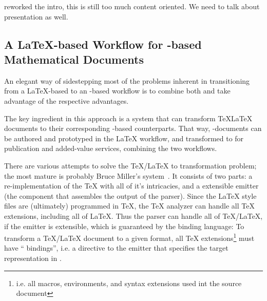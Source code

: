 \begin{newpart}{reworked the intro, this is still too much content oriented. We need to
    talk about presentation as well. }
\subsection{A {\LaTeX}-based Workflow for {\xml}-based Mathematical Documents}
 
An elegant way of sidestepping most of the problems inherent in transitioning from a
{\LaTeX}-based to an {\xml}-based workflow is to combine both and take advantage of the
respective advantages.
 
The key ingredient in this approach is a system that can transform {\TeX\LaTeX} documents
to their corresponding {\xml}-based counterparts. That way, {\xml}-documents can be
authored and prototyped in the {\LaTeX} workflow, and transformed to {\xml} for
publication and added-value services, combining the two workflows.
 
There are various attempts to solve the {\TeX/\LaTeX} to {\xml} transformation problem; the
most mature is probably Bruce Miller's {\latexml} system~\cite{Miller:latexml}. It
consists of two parts: a re-implementation of the {\TeX} {} with all of
it's intricacies, and a extensible {\xml} emitter (the component that assembles the output
of the parser). Since the {\LaTeX} style files are (ultimately) programmed in {\TeX}, the
{\TeX} analyzer can handle all {\TeX} extensions, including all of {\LaTeX}. Thus the
{\latexml} parser can handle all of {\TeX/\LaTeX}, if the emitter is extensible, which is
guaranteed by the {\latexml} binding language: To transform a {\TeX/\LaTeX} document to a
given {\xml} format, all {\TeX} extensions\footnote{i.e. all macros, environments, and
  syntax extensions used int the source document} must have ``{\latexml}
bindings'', i.e. a directive to the {\latexml} emitter that
specifies the target representation in {\xml}.
\end{newpart}

